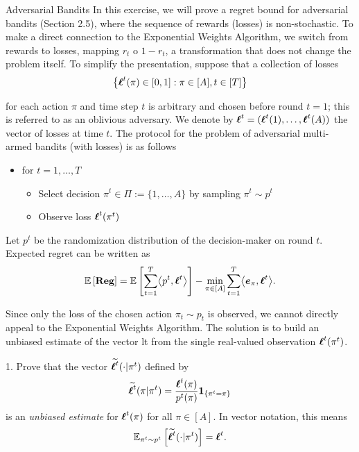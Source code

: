
\begin{exercise}[]{Adversarial Bandits}
    In this exercise, we will prove a regret bound for adversarial bandits
     (Section 2.5), where the sequence of rewards (losses) is non-stochastic.
      To make a direct connection to the Exponential Weights Algorithm, we switch from rewards to losses,       
       mapping $r_t$ o $1-r_t$, a transformation that does not change the problem itself. 
       To simplify the presentation, suppose that a collection of losses
       \[\left \{ \bsl^t(\pi) \in [0,1] : \pi \in [A], t \in [T]\right \} \]


       for each action $\pi$ and time step $t$ is arbitrary and chosen before round $t = 1$;
        this is referred to as an oblivious adversary. We denote by $\bsl^t = (\bsl^t (1), \ldots , \bsl^t(A))$
         the vector of losses at time $t$. The protocol for the problem of adversarial multi-armed bandits (with losses) is as follows
         \begin{itemize}
            \item for $t=1,\ldots,T$ 
            \begin{itemize}
                \item Select decision $\pi^t\in \Pi:=\{1,\ldots,A\}$ by sampling $\pi^t \sim p^t$
                \item Observe loss $\bsl^t(\pi^t)$
            \end{itemize}
         \end{itemize}

         Let $p^t$ be the randomization distribution of the decision-maker on round $t$. 
         Expected regret can be written as
         \[ \EE{\Reg} = \EE{\sum_{t=1}^T \biprod{p^t}{\bsl^t}} - \min_{\pi \in [A]}\sum_{t=1}^T \biprod{\boldsymbol{e}_\pi}{\bsl^t}.\]

Since only the loss of the chosen action $\pi_t \sim p_t$ is observed, we cannot directly appeal to the Exponential Weights Algorithm. 
The solution is to build an unbiased estimate of the vector lt from the single real-valued observation $\bsl^t(\pi^t)$.

1. Prove that the vector $\wt {\bsl^t} (\cdot| \pi^t)$ defined by
\[ \wt{\bsl^t}(\pi | \pi^t) = \frac{\bsl^t(\pi)}{p^t(\pi)} \mathbf{1}_{\{\pi^t=\pi\}}\]
is an \textit{unbiased estimate} for $\bsl^t(\pi)$ for all $\pi \in [A]$. In vector notation, this means 
\[ \EEs{\wt{\bsl^t}(\cdot|\pi^t)}{\pi^t \sim p^t}=\bsl^t.\]


\end{exercise}
